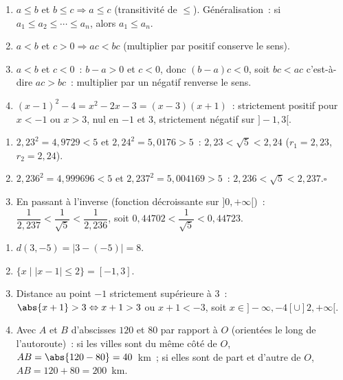 \begin{enumerate}
  \item $a\leq b$ et $b\leq c \Rightarrow a\leq c$ (transitivit\'e de $\leq$).
        G\'en\'eralisation~: si $a_1\leq a_2\leq\cdots\leq a_n$, alors $a_1\leq a_n$.
  \item $a<b$ et $c>0 \Rightarrow ac<bc$ (multiplier par positif conserve le sens).
  \item $a<b$ et $c<0$~: $b-a>0$ et $c<0$, donc $(b-a)c<0$, soit $bc<ac$ c'est-\`a-dire $ac>bc$~: multiplier par un n\'egatif renverse le sens.
  \item $(x-1)^2-4=x^2-2x-3=(x-3)(x+1)$~: strictement positif pour $x<-1$ ou $x>3$, nul en $-1$ et $3$, strictement n\'egatif sur $]-1,3[$.
\end{enumerate}


\begin{enumerate}
  \item $2{,}23^2=4{,}9729<5$ et $2{,}24^2=5{,}0176>5$~:
        $2{,}23<\sqrt{5}<2{,}24$ ($r_1=2{,}23$, $r_2=2{,}24$).
  \item $2{,}236^2=4{,}999696<5$ et $2{,}237^2=5{,}004169>5$~:
        $2{,}236<\sqrt{5}<2{,}237$.\hfill$\square$
  \item En passant \`a l'inverse (fonction d\'ecroissante sur $]0,+\infty[$)~:
        $\dfrac1{2{,}237}<\dfrac1{\sqrt5}<\dfrac1{2{,}236}$, soit
        $0{,}44702<\dfrac1{\sqrt5}<0{,}44723$.
\end{enumerate}


\begin{enumerate}
  \item $d(3,-5)=|3-(-5)|=8$.
  \item $\{x\mid|x-1|\leq2\}=[-1,3]$.
  \item Distance au point $-1$ strictement sup\'erieure \`a $3$~: $\abs{x+1}>3\Leftrightarrow x+1>3$ ou $x+1<-3$,
        soit $x\in]-\infty,-4[\cup]2,+\infty[$.
  \item Avec $A$ et $B$ d'abscisses $120$ et $80$ par rapport \`a $O$ (orient\'ees le long de l'autoroute)~:
        si les villes sont du m\^eme c\^ot\'e de $O$, $AB=\abs{120-80}=40$~km~;
        si elles sont de part et d'autre de $O$, $AB=120+80=200$~km.
\end{enumerate}


